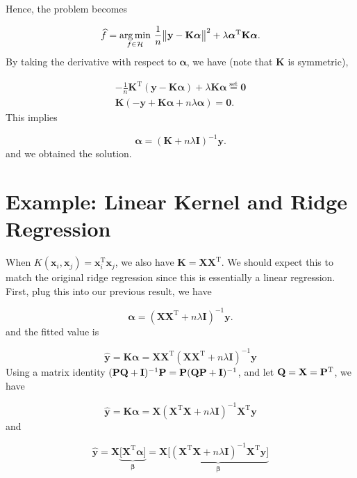\documentclass[
]{book}
\def\bP{{\bf P}}
\def\bQ{{\bf Q}}
\theoremstyle{definition}
\theoremstyle{definition}
\theoremstyle{definition}
\theoremstyle{definition}
\theoremstyle{remark}
\begin{document}
Hence, the problem becomes

\[\widehat f = \underset{f \in {\cal H}}{\arg\min} \,\, \frac{1}{n} \big\lVert \mathbf{y}- \mathbf{K}\boldsymbol \alpha\big\rVert^2 + \lambda \boldsymbol \alpha^\text{T}\mathbf{K}\boldsymbol \alpha.\]
By taking the derivative with respect to \(\boldsymbol \alpha\), we have (note that \(\mathbf{K}\) is symmetric),

\begin{align}
-\frac{1}{n} \mathbf{K}^\text{T}(\mathbf{y}- \mathbf{K}\boldsymbol \alpha) + \lambda \mathbf{K}\boldsymbol \alpha\overset{\text{set}}{=} \mathbf{0} \nonumber \\
\mathbf{K}(- \mathbf{y}+ \mathbf{K}\boldsymbol \alpha+ n\lambda \boldsymbol \alpha) = \mathbf{0}.
\end{align}
This implies

\[ \boldsymbol \alpha= (\mathbf{K}+ n\lambda \mathbf{I})^{-1} \mathbf{y}.\]
and we obtained the solution.

\hypertarget{example-linear-kernel-and-ridge-regression}{%
\section{Example: Linear Kernel and Ridge Regression}\label{example-linear-kernel-and-ridge-regression}}

When \(K(\mathbf{x}_i, \mathbf{x}_j) = \mathbf{x}_i^\text{T}\mathbf{x}_j\), we also have \(\mathbf{K}= \mathbf{X}\mathbf{X}^\text{T}\). We should expect this to match the original ridge regression since this is essentially a linear regression. First, plug this into our previous result, we have

\[ \boldsymbol \alpha= (\mathbf{X}\mathbf{X}^\text{T}+ n\lambda \mathbf{I})^{-1} \mathbf{y}.\]
and the fitted value is

\[ \widehat{\mathbf{y}} = \mathbf{K}\boldsymbol \alpha= \mathbf{X}\mathbf{X}^\text{T}(\mathbf{X}\mathbf{X}^\text{T}+ n\lambda \mathbf{I})^{-1} \mathbf{y}\]
Using a matrix identity \((\bP \bQ + \mathbf{I})^{-1}\bP = \bP (\bQ \bP + \mathbf{I})^{-1}\), and let \(\bQ = \mathbf{X}= \bP^\text{T}\), we have

\[ \widehat{\mathbf{y}} = \mathbf{K}\boldsymbol \alpha= \mathbf{X}(\mathbf{X}^\text{T}\mathbf{X}+ n\lambda \mathbf{I})^{-1} \mathbf{X}^\text{T}\mathbf{y}\]
and

\[ \widehat{\mathbf{y}} = \mathbf{X}\underbrace{\big[ \mathbf{X}^\text{T}\boldsymbol \alpha\big]}_{\boldsymbol \beta} = \mathbf{X}\underbrace{\big[ (\mathbf{X}^\text{T}\mathbf{X}+ n\lambda \mathbf{I})^{-1} \mathbf{X}^\text{T}\mathbf{y}\big]}_{\boldsymbol \beta}\]
\end{document}

